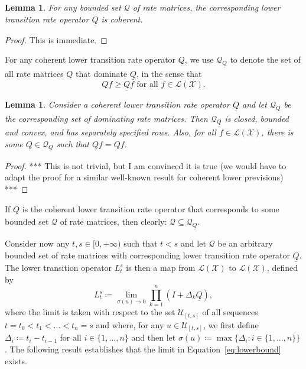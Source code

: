 \documentclass[a4paper,reqno]{amsart}
\newtheorem{lemma}[theorem]{Lemma}
\newcommand{\states}{\mathcal{X}}
\newcommand{\lbound}{L}
\newcommand{\gambles}{\mathcal{L}}
\newcommand{\gamblesX}{\gambles(\states)}
\newcommand{\rateset}{\mathcal{Q}}
\newcommand{\lrate}{\underline{Q}}
\begin{document}
\begin{lemma}\label{lemma:lrateiscoherent}
For any bounded set $\rateset$ of rate matrices, the corresponding lower transition rate operator $\lrate$ is coherent.
\end{lemma}
\begin{proof}
This is immediate.
\end{proof}

For any coherent lower transition rate operator $\lrate$, we use $\rateset_{\lrate}$ to denote the set of all rate matrices $Q$ that dominate $\lrate$, in the sense that
\begin{equation*}
Qf\geq\lrate f\text{ for all $f\in\gamblesX$.}
\end{equation*}

\begin{lemma}
Consider a coherent lower transition rate operator $\lrate$ and let $\rateset_{\lrate}$ be the corresponding set of dominating rate matrices. Then $\rateset_{\lrate}$ is closed, bounded and convex, and has separately specified rows. Also, for all $f\in\gamblesX$, there is some $Q\in\rateset_{\lrate}$ such that $\lrate f=Qf$.
\end{lemma}
\begin{proof}
*** This is not trivial, but I am convinced it is true (we would have to adapt the proof for a similar well-known result for coherent lower previsions) ***
\end{proof}

\noindent
If $\lrate$ is the coherent lower transition rate operator that corresponds to some bounded set $\rateset$ of rate matrices, then clearly: $\rateset\subseteq\rateset_{\lrate}$.

Consider now any $t,s\in[0,+\infty)$ such that $t<s$ and let $\rateset$ be an arbitrary bounded set of rate matrices with corresponding lower transition rate operator $\lrate$. The lower transition operator $\lbound_t^s$ is then a map from $\gamblesX$ to $\gamblesX$, defined by
\begin{equation}\label{eq:lowerbound}
\lbound_t^s\coloneqq\lim_{\sigma(u)\to0}\prod_{k=1}^n(I+\Delta_k\lrate),
\end{equation}
where the limit is taken with respect to the set $\mathcal{U}_{[t,s]}$ of all sequences $t=t_0<t_1<\dots<t_n=s$ and where, for any $u\in\mathcal{U}_{[t,s]}$, we first define $\Delta_i\coloneqq t_i-t_{i-1}$ for all $i\in\{1,\dots,n\}$ and then let $\sigma(u)\coloneqq\max\{\Delta_i\colon i\in\{1,\dots,n\}\}$. The following result establishes that the limit in Equation~\eqref{eq:lowerbound} exists.
\end{document}
